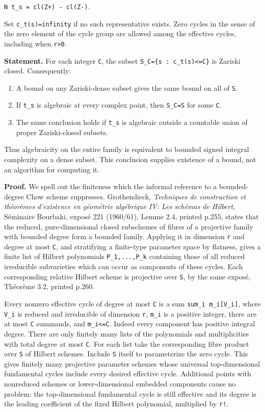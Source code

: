 \documentclass[11pt,a4paper]{article}
\providecommand{\tightlist}{\setlength{\itemsep}{0pt}\setlength{\parskip}{0pt}}
\theoremstyle{definition}
\begin{document}
\texttt{N\ t\_s\ =\ cl(Z+)\ -\ cl(Z-)}.

Set \texttt{c\_t(s)=infinity} if no such representative exists. Zero
cycles in the sense of the zero element of the cycle group are allowed
among the effective cycles, including when \texttt{r\textgreater{}0}.

\textbf{Statement.} For each integer \texttt{C}, the subset
\texttt{S\_C=\{s\ :\ c\_t(s)\textless{}=C\}} is Zariski closed.
Consequently:

\begin{enumerate}
\def\labelenumi{\arabic{enumi}.}
\tightlist
\item
  A bound on any Zariski-dense subset gives the same bound on all of
  \texttt{S}.
\item
  If \texttt{t\_s} is algebraic at every complex point, then
  \texttt{S\_C=S} for some \texttt{C}.
\item
  The same conclusion holds if \texttt{t\_s} is algebraic outside a
  countable union of proper Zariski-closed subsets.
\end{enumerate}

Thus algebraicity on the entire family is equivalent to bounded signed
integral complexity on a dense subset. This conclusion supplies
existence of a bound, not an algorithm for computing it.

\textbf{Proof.} We spell out the finiteness which the informal reference
to a bounded-degree Chow scheme suppresses. Grothendieck,
\emph{Techniques de construction et théorèmes d'existence en géométrie
algébrique IV: Les schémas de Hilbert}, Séminaire Bourbaki, exposé 221
(1960/61), Lemme 2.4, printed p.255, states that the reduced,
pure-dimensional closed subschemes of fibres of a projective family with
bounded degree form a bounded family. Applying it in dimension
\texttt{r} and degree at most \texttt{C}, and stratifying a finite-type
parameter space by flatness, gives a finite list of Hilbert polynomials
\texttt{P\_1,...,P\_k} containing those of all reduced irreducible
subvarieties which can occur as components of these cycles. Each
corresponding relative Hilbert scheme is projective over \texttt{S}, by
the same exposé, Théorème 3.2, printed p.260.

Every nonzero effective cycle of degree at most \texttt{C} is a sum
\texttt{sum\_i\ m\_i{[}V\_i{]}}, where \texttt{V\_i} is reduced and
irreducible of dimension \texttt{r}, \texttt{m\_i} is a positive
integer, there are at most \texttt{C} summands, and
\texttt{m\_i\textless{}=C}. Indeed every component has positive integral
degree. There are only finitely many lists of the polynomials and
multiplicities with total degree at most \texttt{C}. For each list take
the corresponding fibre product over \texttt{S} of Hilbert schemes.
Include \texttt{S} itself to parameterize the zero cycle. This gives
finitely many projective parameter schemes whose universal
top-dimensional fundamental cycles include every desired effective
cycle. Additional points with nonreduced schemes or lower-dimensional
embedded components cause no problem: the top-dimensional fundamental
cycle is still effective and its degree is the leading coefficient of
the fixed Hilbert polynomial, multiplied by \texttt{r!}.
\end{document}
